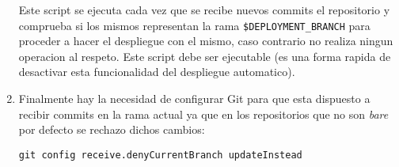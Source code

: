 \begin{enumerate}
\begin{lstlisting}[breaklines=true]
    \end{lstlisting} %
    Este script se ejecuta cada vez que se recibe nuevos commits el repositorio y comprueba si los mismos representan la rama \texttt{\$DEPLOYMENT\_BRANCH} para proceder a hacer el despliegue con el mismo, caso contrario no realiza ningun operacion al respeto. Este script debe ser ejecutable (es una forma rapida de desactivar esta funcionalidad del despliegue automatico).
    \item Finalmente hay la necesidad de configurar Git para que esta dispuesto a recibir commits en la rama actual ya que en los repositorios que no son \textit{bare} por defecto se rechazo dichos cambios:
    \begin{lstlisting}
git config receive.denyCurrentBranch updateInstead
    \end{lstlisting} %
\end{enumerate}

